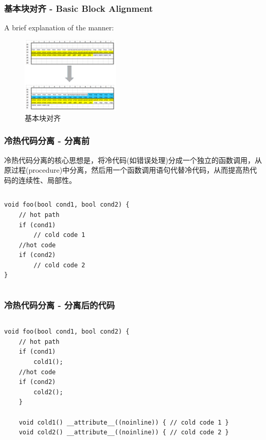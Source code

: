 \begin{frame}
\frametitle{基本块对齐 - Basic Block Alignment}
\centering

A brief explanation of the manner:

\begin{figure}
    \centering
    \includegraphics[width=0.418\textwidth]{images/alignment.png}
    \caption{基本块对齐}
\end{figure}

\end{frame}
\begin{frame}[fragile]
    \frametitle{冷热代码分离 - 分离前}
    冷热代码分离的核心思想是，将冷代码(如错误处理)分成一个独立的函数调用，从原过程(procedure)中分离，然后用一个函数调用语句代替冷代码，从而提高热代码的连续性、局部性。
    \begin{columns}
        \begin{column}{0.7\textwidth}
            \begin{lstlisting}
void foo(bool cond1, bool cond2) {
    // hot path
    if (cond1)
        // cold code 1
    //hot code
    if (cond2)
        // cold code 2
}
            \end{lstlisting}
        \end{column}
    \end{columns}
\end{frame}


\begin{frame}[fragile]
    \frametitle{冷热代码分离 - 分离后的代码}
    \begin{columns}
        \begin{column}{1.0\textwidth}
            \begin{lstlisting}
void foo(bool cond1, bool cond2) {
    // hot path
    if (cond1)
        cold1(); 
    //hot code
    if (cond2)
        cold2(); 
    }
    
    void cold1() __attribute__((noinline)) { // cold code 1 }
    void cold2() __attribute__((noinline)) { // cold code 2 }
            \end{lstlisting}
        \end{column}
    \end{columns}
\end{frame}

